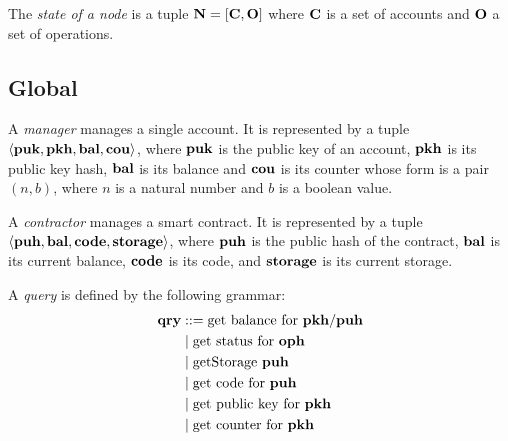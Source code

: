\documentclass[a4paper]{llncs}
\begin{document}
\begin{definition}%
  The \emph{state of a node} is a tuple
  $\textbf{N} = [\textbf{C}, \textbf{O}]$ where $\textbf{C}$ is a set of
  accounts and
  $\textbf{O}$ a set of operations.
\end{definition}

\subsection{Global}
\label{sec:global}



\begin{definition}%
A \emph{manager} manages a single account. It is represented by a
tuple $\langle  \textbf{puk}, \textbf{pkh}, \textbf{bal}, \textbf{cou} \rangle $, where  $\textbf{puk}$ is the
public key of an account, $\textbf{pkh}$ is its public key hash, $\textbf{bal}$ is its
balance and $\textbf{cou}$ is its counter whose form is a pair $(n, b)$, where $n$ is a natural number and ${b}$
is a boolean value.  
\end{definition}

\begin{definition}%
  A \emph{contractor} manages a smart contract. It is
  represented by a tuple
  $\langle \textbf{puh}, \textbf{bal}, \textbf{code}, \textbf{storage} \rangle $, where $\textbf{puh}$ is the
  public hash of the contract, $\textbf{bal}$ is its current balance, $\textbf{code}$ is its
  code, and $\textbf{storage}$ is its current storage.
\end{definition}


\begin{definition}%
A \emph{query} is defined by the following grammar:
\begin{align*}
  \textbf{qry} & ::= \text{get balance for $\textbf{pkh} / \textbf{puh}$}
  \\&\mid \text{get status for $\textbf{oph}$}
  \\&\mid \text{getStorage $\textbf{puh}$}
  \\&\mid \text{get code for $\textbf{puh}$} 
  \\&\mid \text{get public key for $\textbf{pkh}$}
  \\&\mid \text{get counter for $\textbf{pkh}$}
\end{align*}


\end{definition}
\end{document}
